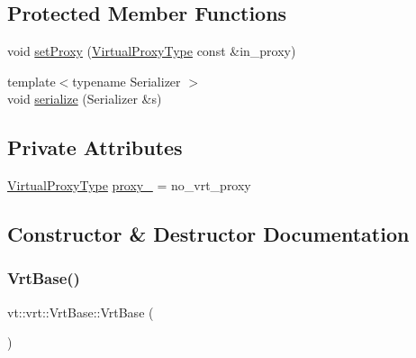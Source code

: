 \subsection*{Protected Member Functions}
\begin{DoxyCompactItemize}
\item 
void \hyperlink{structvt_1_1vrt_1_1_vrt_base_aa85b1aa3096a2adffe229927d76cebfd}{set\+Proxy} (\hyperlink{namespacevt_a1b417dd5d684f045bb58a0ede70045ac}{Virtual\+Proxy\+Type} const \&in\+\_\+proxy)
\item 
{\footnotesize template$<$typename Serializer $>$ }\\void \hyperlink{structvt_1_1vrt_1_1_vrt_base_acabd8e5dbd23894c036e870148ddba90}{serialize} (Serializer \&s)
\end{DoxyCompactItemize}
\subsection*{Private Attributes}
\begin{DoxyCompactItemize}
\item 
\hyperlink{namespacevt_a1b417dd5d684f045bb58a0ede70045ac}{Virtual\+Proxy\+Type} \hyperlink{structvt_1_1vrt_1_1_vrt_base_a1904e5218715dc8f4ec7c186ce4ffee3}{proxy\+\_\+} = no\+\_\+vrt\+\_\+proxy
\end{DoxyCompactItemize}


\subsection{Constructor \& Destructor Documentation}
\mbox{\label{structvt_1_1vrt_1_1_vrt_base_a5f98da4f22c55e58f5759eb84ac7cd06}} 
\subsubsection{\texorpdfstring{Vrt\+Base()}{VrtBase()}\hspace{0.1cm}{\footnotesize\ttfamily [1/2]}}
{\footnotesize\ttfamily vt\+::vrt\+::\+Vrt\+Base\+::\+Vrt\+Base (\begin{DoxyParamCaption}{ }\end{DoxyParamCaption})\hspace{0.3cm}{\ttfamily [default]}}

\mbox{\label{structvt_1_1vrt_1_1_vrt_base_a7cc2b4f4ad3f2807e73b3d7a0a5b3676}} 
